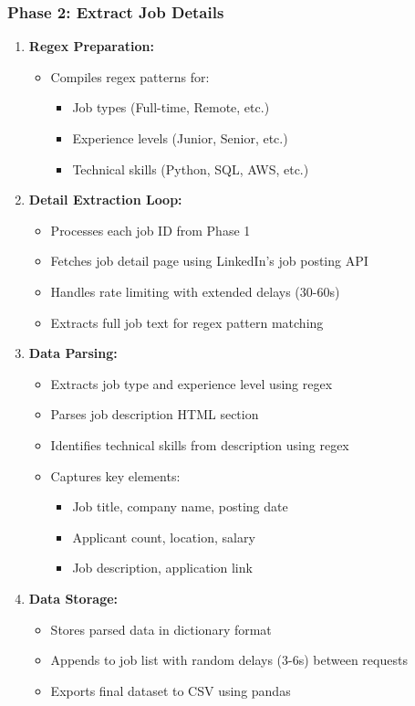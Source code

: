 \documentclass[runningheads]{llncs}
\begin{document}
\subsubsection{Phase 2: Extract Job Details}
\begin{enumerate}[leftmargin=*]
	\item \textbf{Regex Preparation:}
	\begin{itemize}
		\item Compiles regex patterns for:
		\begin{itemize}
			\item Job types (Full-time, Remote, etc.)
			\item Experience levels (Junior, Senior, etc.)
			\item Technical skills (Python, SQL, AWS, etc.)
		\end{itemize}
	\end{itemize}
	
	\item \textbf{Detail Extraction Loop:}
	\begin{itemize}
		\item Processes each job ID from Phase 1
		\item Fetches job detail page using LinkedIn's job posting API
		\item Handles rate limiting with extended delays (30-60s)
		\item Extracts full job text for regex pattern matching
	\end{itemize}
	
	\item \textbf{Data Parsing:}
	\begin{itemize}
		\item Extracts job type and experience level using regex
		\item Parses job description HTML section
		\item Identifies technical skills from description using regex
		\item Captures key elements:
		\begin{itemize}
			\item Job title, company name, posting date
			\item Applicant count, location, salary
			\item Job description, application link
		\end{itemize}
	\end{itemize}
	
	\item \textbf{Data Storage:}
	\begin{itemize}
		\item Stores parsed data in dictionary format
		\item Appends to job list with random delays (3-6s) between requests
		\item Exports final dataset to CSV using pandas
	\end{itemize}
\end{enumerate}
\end{document}
